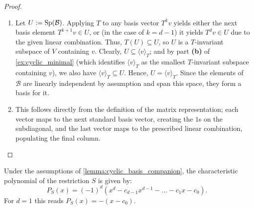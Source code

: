 \begin{proof}
  \begin{enumerate}[label=\textbf{(\alph*)}]
    \item Let $U := \operatorname{Sp}(\mathcal{B})$. Applying $T$ to any basis vector $T^k v$ yields either the next basis element $T^{k+1}v \in U$, or (in the case of $k=d-1$) it yields $T^d v \in U$ due to the given linear combination. Thus, $T(U) \subseteq U$, so $U$ is a $T$-invariant subspace of $V$ containing $v$. Clearly, $U \subseteq \langle v \rangle_T$; and by part \textbf{(b)} of \cref{ex:cyclic_minimal} (which identifies $\langle v \rangle_T$ as the smallest $T$-invariant subspace containing $v$), we also have $\langle v \rangle_T \subseteq U$. Hence, $U = \langle v \rangle_T$. Since the elements of $\mathcal{B}$ are linearly independent by assumption and span this space, they form a basis for it.
    \item This follows directly from the definition of the matrix representation; each vector maps to the next standard basis vector, creating the $1$s on the subdiagonal, and the last vector maps to the prescribed linear combination, populating the final column.
  \end{enumerate}
\end{proof}

\begin{lemma}
  \label{lemma:companion_char_poly}
  Under the assumptions of \cref{lemma:cyclic_basis_companion}, the characteristic polynomial of the restriction $S$ is given by:
  \[
  P_S(x) = (-1)^d (x^d - c_{d-1}x^{d-1} - \dots - c_1 x - c_0).
  \]
  For $d = 1$ this reads $P_S(x) = -(x - c_0)$.
\end{lemma}

